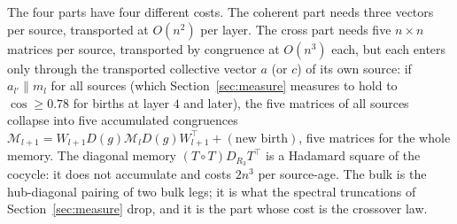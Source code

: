 The four parts have four different costs. The coherent part needs three vectors per source, transported at $O(n^2)$ per
layer. The cross part needs five $n\times n$ matrices per source, transported by congruence at $O(n^3)$ each, but each
enters only through the transported collective vector $a$ (or $c$) of its own source: if $a_{l'}\parallel m_l$ for
all sources (which Section~\ref{sec:measure} measures to hold to $\cos\ge0.78$ for births at layer $4$ and later),
the five matrices of all sources collapse into five accumulated congruences
$\mathcal M_{l+1}=W_{l+1}D(g)\mathcal M_lD(g)W_{l+1}^{\!\top}+(\text{new birth})$, five matrices for the whole memory.
The diagonal memory $(T\circ T)D_{R_3}T^{\!\top}$ is a Hadamard square of the cocycle: it does not accumulate and
costs $2n^3$ per source-age. The bulk is the hub-diagonal pairing of two bulk legs; it is what the spectral
truncations of Section~\ref{sec:measure} drop, and it is the part whose cost is the crossover law.
